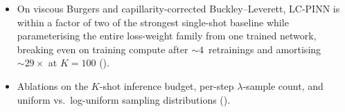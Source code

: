 \begin{itemize}
         construction transfers without architectural changes
         (); this rules out the
         suspicion that the lift is specific to the wave operator.
   \item On viscous Burgers and capillarity-corrected
         Buckley--Leverett, LC-PINN is within a factor of two of
         the strongest single-shot baseline while parameterising
         the entire loss-weight family from one trained network,
         breaking even on training compute after
         $\sim\!4$~retrainings and amortising $\sim\!29\times$ at
         $K\!=\!100$ ().
   \item Ablations on the $K$-shot inference budget, per-step
         $\lambda$-sample count, and uniform vs.\ log-uniform
         sampling distributions ().
\end{itemize}
